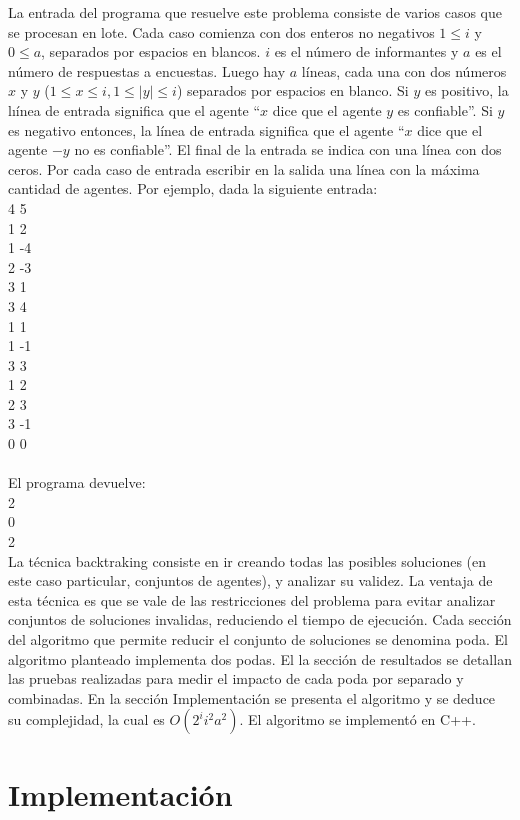 \documentclass{article}
\begin{document}
La entrada del programa que resuelve este problema consiste de varios casos que se procesan en lote. Cada caso comienza con dos enteros no negativos $1 \leq i$ y $0 \leq a$, separados por espacios en blancos. $i$ es el número de informantes y $a$ es el número de respuestas a encuestas. Luego hay $a$ líneas, cada una con dos números $x$ y $y$ ($1 \leq x \leq i, 1 \leq |y| \leq i$) separados por espacios en blanco. Si $y$ es positivo, la lıínea de entrada significa que el agente “$x$ dice que el agente $y$ es confiable”. Si $y$ es negativo entonces, la línea de entrada significa que el agente “$x$ dice que el agente $-y$ no es confiable”. El final de la entrada se indica con una línea con dos ceros. Por cada caso de entrada escribir en la salida una línea con la máxima cantidad de agentes. Por ejemplo, dada la siguiente entrada: \\
4 5 \\
1 2 \\
1 -4 \\
2 -3 \\
3 1 \\
3 4 \\
1 1 \\
1 -1 \\
3 3 \\
1 2 \\
2 3 \\
3 -1 \\
0 0 \\ \\
El programa devuelve: \\
2 \\
0 \\
2 \\

La técnica backtraking consiste en ir creando todas las posibles soluciones (en este caso particular, conjuntos de agentes), y analizar su validez. La ventaja de esta técnica es que se vale de las restricciones del problema para evitar analizar conjuntos de soluciones invalidas, reduciendo el tiempo de ejecución. Cada sección del algoritmo que permite reducir el conjunto de soluciones se denomina poda. El algoritmo planteado implementa dos podas. El la sección de resultados se detallan las pruebas realizadas para medir el impacto de cada poda por separado y combinadas.
En la sección Implementación se presenta el algoritmo y se deduce su complejidad, la cual es $O(2^i i^2 a^2) $.
 El algoritmo se implementó en C++. 

\section{Implementación}
\end{document}
